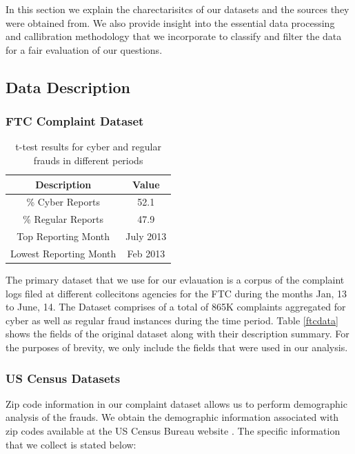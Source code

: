 \documentclass[conference]{IEEEtran}
\begin{document}
In this section we explain the charectarisitcs of our datasets and the sources they were obtained from. We also provide insight into the essential data processing and callibration methodology that we incorporate to classify and filter the data for a fair evaluation of our questions.

\subsection{Data Description}

\subsubsection{FTC Complaint Dataset}

\begin{table}[h]
\centering
\begin{tabular}{c|c}
\hline
{\bfseries Description} & \multicolumn{1}{c}{\bfseries Value}
\\
\hline
\hline
\% Cyber Reports &52.1\\
\hline
\% Regular Reports & 47.9\\
\hline
Top Reporting Month & July 2013\\
\hline
Lowest Reporting Month & Feb 2013\\
\hline
\end{tabular}
\vspace{8pt}
\caption{t-test results for cyber and regular frauds in different periods}\label{ttest}
\vspace{-10pt}
\end{table}


The primary dataset that we use for our evlauation is a corpus of the complaint logs filed at different collecitons agencies for the FTC during the months Jan, 13 to June, 14. The Dataset comprises of a total of 865K complaints aggregated for cyber as well as regular fraud instances during the time period. Table \ref{ftcdata} shows the fields of the original dataset along with their description summary. For the purposes of brevity, we only include the fields that were used in our analysis.
\\
\subsubsection{US Census Datasets}
Zip code information in our complaint dataset allows us to perform demographic analysis of the frauds. We obtain the demographic information associated with zip codes available at the US Census Bureau website \cite{usbureau}. The specific information that we collect is stated below:
\end{document}
